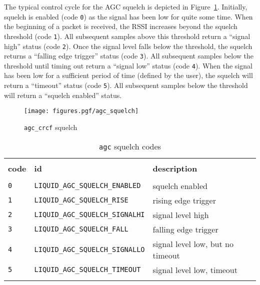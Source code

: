 The typical control cycle for the AGC squelch is depicted in
Figure~\ref{fig:module:agc:squelch}.
Initially, squelch is enabled (code {\tt 0}) as the signal has been low for
quite some time.
When the beginning of a packet is received, the RSSI increases beyond the
squelch threshold (code {\tt 1}).
All subsequent samples above this threshold return a ``signal high'' status
(code {\tt 2}).
Once the signal level falls below the threshold, the squelch returns a
``falling edge trigger'' status (code {\tt 3}).
All subsequent samples below the threshold until timing out return a ``signal
low'' status (code {\tt 4}).
When the signal has been low for a sufficient period of time (defined by the
user), the squelch will return a ``timeout'' status (code {\tt 5}).
All subsequent samples below the threshold will return a ``squelch enabled''
status.

\begin{figure}
\centering
  \texttt{[image: figures.pgf/agc\_squelch]}
\caption{{\tt agc\_crcf} squelch}
\label{fig:module:agc:squelch}
\end{figure}


\begin{table}[!ht]
\caption{{\tt agc} squelch codes}
\label{tab:module:agc:squelch_codes}
\centering
\begin{tabular*}{0.95\textwidth}{@{\extracolsep{\fill}}lll}

\hline\hline \\[-6pt]
{\bf code} & {\bf id} & {\bf description} \\[6pt]
\hline \\[-6pt]
{\tt 0} & {\tt LIQUID\_AGC\_SQUELCH\_ENABLED}    & squelch enabled \\
{\tt 1} & {\tt LIQUID\_AGC\_SQUELCH\_RISE}       & rising edge trigger \\
{\tt 2} & {\tt LIQUID\_AGC\_SQUELCH\_SIGNALHI}   & signal level high \\
{\tt 3} & {\tt LIQUID\_AGC\_SQUELCH\_FALL}       & falling edge trigger \\
{\tt 4} & {\tt LIQUID\_AGC\_SQUELCH\_SIGNALLO}   & signal level low, but no timeout \\
{\tt 5} & {\tt LIQUID\_AGC\_SQUELCH\_TIMEOUT}    & signal level low, timeout \\ \\[-6pt]

\hline\hline
\end{tabular*}
\end{table}%


